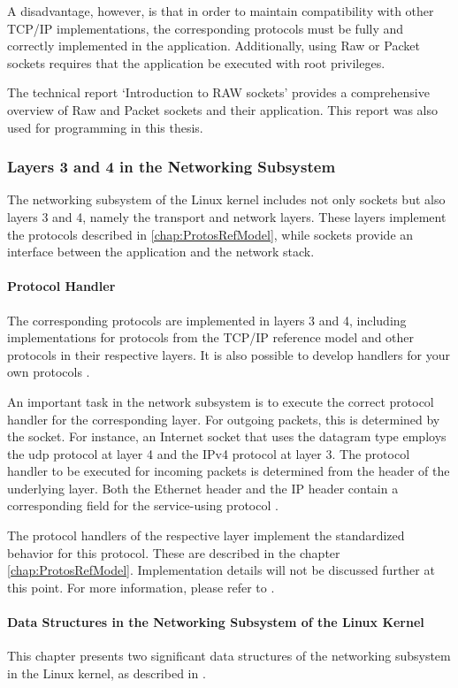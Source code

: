 A disadvantage, however, is that in order to maintain compatibility with other TCP/IP implementations, the corresponding protocols must be fully and correctly implemented in the application. Additionally, using Raw or Packet sockets requires that the application be executed with root privileges.

The technical report `Introduction to RAW sockets' \cite{sock07} provides a comprehensive overview of Raw and Packet sockets and their application. This report was also used for programming in this thesis.



\subsubsection{Layers 3 and 4 in the Networking Subsystem}
The networking subsystem of the Linux kernel includes not only sockets but also layers 3 and 4, namely the transport and network layers. These layers implement the protocols described in \ref{chap:ProtosRefModel}, while sockets provide an interface between the application and the network stack.

\paragraph{Protocol Handler}
The corresponding protocols are implemented in layers 3 and 4, including implementations for protocols from the TCP/IP reference model and other protocols in their respective layers. It is also possible to develop handlers for your own protocols \cite{lins06}.

An important task in the network subsystem is to execute the correct protocol handler for the corresponding layer. For outgoing packets, this is determined by the socket. For instance, an Internet socket that uses the datagram type employs the \ac{udp} protocol at layer 4 and the IPv4 protocol at layer 3. The protocol handler to be executed for incoming packets is determined from the header of the underlying layer. Both the Ethernet header and the IP header contain a corresponding field for the service-using protocol \cite{lins06}.

The protocol handlers of the respective layer implement the standardized behavior for this protocol. These are described in the chapter \ref{chap:ProtosRefModel}. Implementation details will not be discussed further at this point. For more information, please refer to \cite{lins01}.

\paragraph{Data Structures in the Networking Subsystem of the Linux Kernel}
This chapter presents two significant data structures of the networking subsystem in the Linux kernel, as described in \cite{lins06}.

